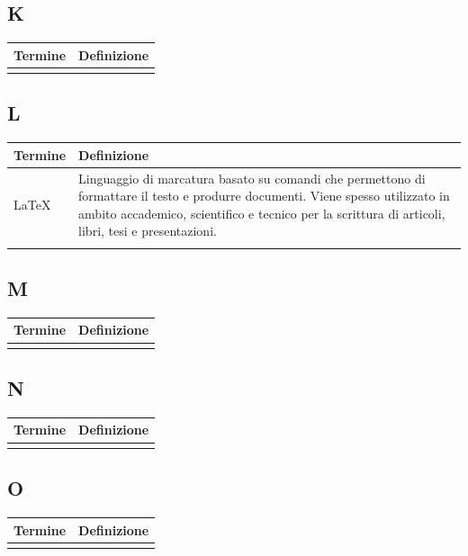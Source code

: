 \documentclass[10pt]{article}
\begin{document}
\subsection{K} %
\begin{tabularx}{\textwidth}{|>{\centering\arraybackslash}l|X|}
\hline
\rowcolor[gray]{0.8}
\textbf{Termine} & \textbf{Definizione}\\
\hline
 & \\
\hline
\end{tabularx}

\subsection{L} %
\begin{tabularx}{\textwidth}{|>{\centering\arraybackslash}l|X|}
\hline
\rowcolor[gray]{0.8}
\textbf{Termine} & \textbf{Definizione}\\
\hline
LaTeX & Linguaggio di marcatura basato su comandi che permettono di formattare il testo e produrre documenti. Viene spesso utilizzato in ambito accademico, scientifico e tecnico per la scrittura di articoli, libri, tesi e presentazioni.\\
\hline
 & \\
\hline
\end{tabularx}
 
\subsection{M} %
\begin{tabularx}{\textwidth}{|>{\centering\arraybackslash}l|X|}
\hline
\rowcolor[gray]{0.8}
\textbf{Termine} & \textbf{Definizione}\\
\hline
 & \\
\hline
\end{tabularx}

\subsection{N} %
\begin{tabularx}{\textwidth}{|>{\centering\arraybackslash}l|X|}
\hline
\rowcolor[gray]{0.8}
\textbf{Termine} & \textbf{Definizione}\\
\hline
 & \\
\hline
\end{tabularx}

\subsection{O} %
\begin{tabularx}{\textwidth}{|>{\centering\arraybackslash}l|X|}
\hline
\rowcolor[gray]{0.8}
\textbf{Termine} & \textbf{Definizione}\\
\hline
 & \\
\hline
\end{tabularx}
\end{document}
